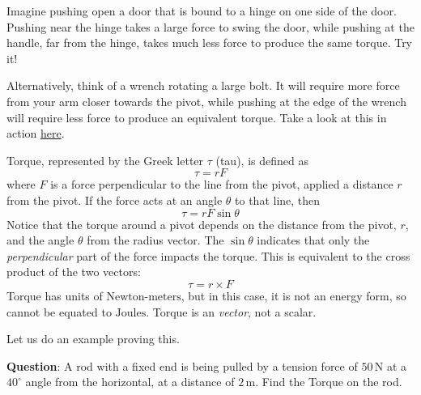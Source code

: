 Imagine pushing open a door that is bound to a hinge on one side of the door. Pushing near the hinge takes a large force to swing the door, while
pushing at the handle, far from the hinge, takes much less force to
produce the same torque. Try it!

Alternatively, think of a wrench rotating a large bolt. It will require more force from your arm closer towards the pivot, while pushing at the edge of the wrench will require less force to produce an equivalent torque. Take a look at this in action \href{https://www.youtube.com/watch?v=vQ8etJxpOSw}{here}.


\begin{mdframed}[frametitle = {Torque}, style = important]
Torque, represented by the Greek letter $\tau$ (tau), is defined as
\begin{equation}
    \tau = rF
    \label{eq:torque_perp}
\end{equation}
where $F$ is a force perpendicular to the line from the pivot, applied a
distance $r$ from the pivot. If the force acts at an angle $\theta$ to that
line, then
\begin{equation}
    \tau = r F \sin\theta
    \label{eq:torque_sin}
\end{equation}
Notice that the torque around a pivot depends on the distance from the pivot, $r$, and the angle $\theta$ from the radius vector. The $\sin\theta$ indicates that only the \emph{perpendicular} part of the force impacts the torque. This is equivalent to the cross product of the two vectors:
\begin{equation}
    \tau = r \times F
    \label{eq:torque_cross}
\end{equation}
Torque has units of $\text{Newton-meters}$, but in this case, it is not an energy form, so cannot be equated to $\text{Joules}$. Torque is an \emph{vector}, not a scalar.
\end{mdframed}

Let us do an example proving this.

\textbf{Question}: A rod with a fixed end is being pulled by a tension force of $50 \,\text{N}$ at a $40^\circ$ angle from the horizontal, at a distance of $2 \,\text{m}$. Find the Torque on the rod.



